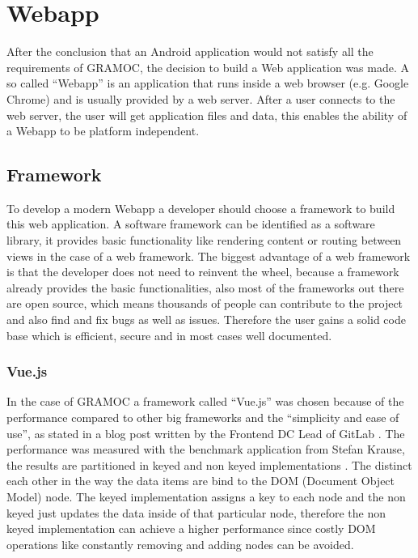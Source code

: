 \chapter{Webapp}
\label{ch:Webapp}

\author{Nico Leidenfrost}
%
After the conclusion that an Android application would not satisfy all the requirements of GRAMOC, the decision to build a Web application was made. A so called ``Webapp'' is an application that runs inside a web browser (e.g. Google Chrome) and is usually provided by a web server. After a user connects to the web server, the user will get application files and data, this enables the ability of a Webapp to be platform independent.

\section{Framework}
To develop a modern Webapp a developer should choose a framework to build this web application. A software framework can be identified as a software library, it provides basic functionality like rendering content or routing between views in the case of a web framework. The biggest advantage of a web framework is that the developer does not need to reinvent the wheel, because a framework already provides the basic functionalities, also most of the frameworks out there are open source, which means thousands of people can contribute to the project and also find and fix bugs as well as issues. Therefore the user gains a solid code base which is efficient, secure and in most cases well documented.

\subsection{Vue.js}
In the case of GRAMOC a framework called ``Vue.js'' was chosen because of the performance compared to other big frameworks and the ``simplicity and ease of use'', as stated in a blog post written by the Frontend DC Lead of GitLab \cite{Vue} \cite{WhyVue} \cite{GitLab}. The performance was measured with the benchmark application from Stefan Krause, the results are partitioned in keyed and non keyed implementations \cite{FrameworkBenchmark}. The distinct each other in the way the data items are bind to the DOM (Document Object Model) node. The keyed implementation assigns a key to each node and the non keyed just updates the data inside of that particular node, therefore the non keyed implementation can achieve a higher performance since costly DOM operations like constantly removing and adding nodes can be avoided.

